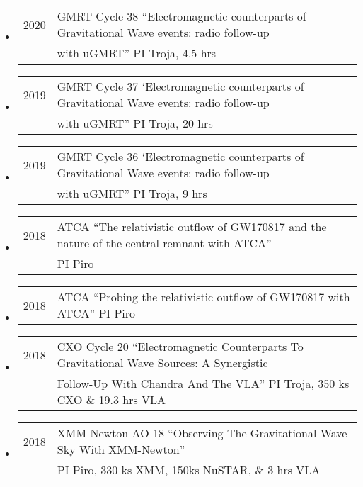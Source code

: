 \begin{itemize}
\item \begin{tabular}{ll}
2020	& GMRT Cycle 38 ``Electromagnetic counterparts of Gravitational Wave events: radio follow-up\\
	&  with uGMRT'' PI Troja, 4.5 hrs
\end{tabular}
\item \begin{tabular}{ll}
2019	& GMRT Cycle 37 `Electromagnetic counterparts of Gravitational Wave events: radio follow-up\\
	&  with uGMRT'' PI Troja, 20 hrs
\end{tabular}
\item \begin{tabular}{ll}
2019	& GMRT Cycle 36 `Electromagnetic counterparts of Gravitational Wave events: radio follow-up\\
	&  with uGMRT'' PI Troja, 9 hrs
\end{tabular}
\item \begin{tabular}{ll}
2018	& ATCA ``The relativistic outflow of GW170817 and the nature of the central remnant with ATCA''\\
	&  PI Piro
\end{tabular}
\item \begin{tabular}{ll}
2018	& ATCA ``Probing the relativistic outflow of GW170817 with ATCA'' PI Piro
\end{tabular}
\item \begin{tabular}{ll}
2018	& CXO Cycle 20 ``Electromagnetic Counterparts To Gravitational Wave Sources: A Synergistic\\
	&  Follow-Up With Chandra And The VLA'' PI Troja, 350 ks CXO \& 19.3 hrs VLA
\end{tabular}
\item \begin{tabular}{ll}
2018	& XMM-Newton AO 18  ``Observing The Gravitational Wave Sky With XMM-Newton''\\
	&  PI Piro, 330 ks XMM, 150ks NuSTAR, \& 3 hrs VLA
\end{tabular}
\end{itemize}

